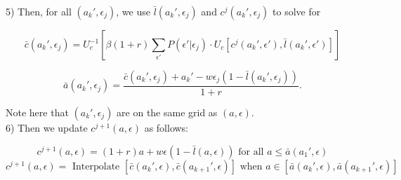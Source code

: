 \documentclass{article}
\begin{document}
		
		5) Then, for all $(a_{k}',\epsilon_{j})$, we use $\bar{l}(a_{k}',\epsilon_{j})$ and $c^{j}(a_{k}',\epsilon_{j})$ to solve for 
		
		$$\bar{c}(a_{k}', \epsilon_{j}) = U_{c}^{-1}\left[ \beta (1+r) \sum_{\epsilon'}P(\epsilon'|\epsilon_{j}) \cdot U_{c}\left[ c^{j}(a_{k}',\epsilon'),\bar{l}(a_{k}',\epsilon') \right] \right]$$
		
		$$\bar{a}(a_{k}', \epsilon_{j}) = \frac{\bar{c}(a_{k}', \epsilon_{j}) + a_{k}' - w\epsilon_{j}(1-\bar{l}(a_{k}',\epsilon_{j}))}{1+r}.$$
		
		Note here that $(a_{k}', \epsilon_{j})$ are on the same grid as $(a,\epsilon)$. \\
		
		6) Then we update $c^{j+1}(a,\epsilon)$ as follows:
		
		$$c^{j+1}(a,\epsilon) = (1+r)a + w \epsilon (1- \bar{l}(a,\epsilon)) \text{ for all } a \leq \bar{a}(a_{1}', \epsilon)$$
		$$c^{j+1}(a,\epsilon) = \text{ Interpolate } [\bar{c}(a_{k}', \epsilon), \bar{c}(a_{k+1}', \epsilon)] \text{ when } a \in [\bar{a}(a_{k}', \epsilon), \bar{a}(a_{k+1}', \epsilon)]$$
	
	
	
\end{document}

